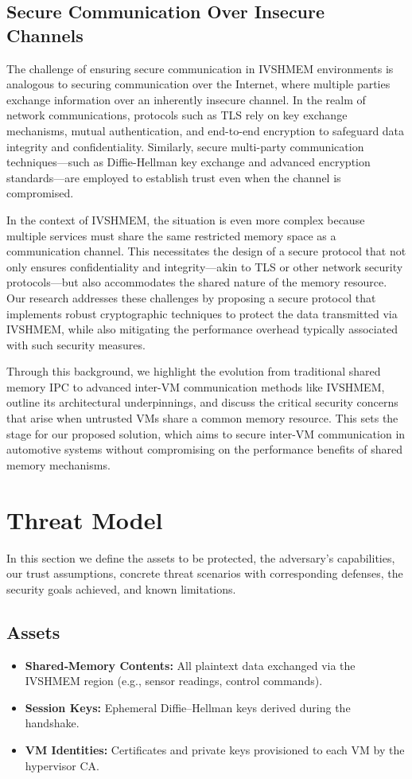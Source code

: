 \documentclass[conference]{IEEEtran}
\begin{document}
\subsection{Secure Communication Over Insecure Channels}

The challenge of ensuring secure communication in IVSHMEM environments is
analogous to securing communication over the Internet, where multiple parties
exchange information over an inherently insecure channel. In the realm of
network communications, protocols such as TLS rely on key exchange mechanisms,
mutual authentication, and end-to-end encryption to safeguard data integrity
and confidentiality. Similarly, secure multi-party communication
techniques—such as Diffie-Hellman key exchange and advanced encryption
standards—are employed to establish trust even when the channel is compromised.

In the context of IVSHMEM, the situation is even more complex because multiple
services must share the same restricted memory space as a communication
channel. This necessitates the design of a secure protocol that not only
ensures confidentiality and integrity—akin to TLS or other network security
protocols—but also accommodates the shared nature of the memory resource. Our
research addresses these challenges by proposing a secure protocol that
implements robust cryptographic techniques to protect the data transmitted via
IVSHMEM, while also mitigating the performance overhead typically associated
with such security measures.

Through this background, we highlight the evolution from traditional shared
memory IPC to advanced inter-VM communication methods like IVSHMEM, outline its
architectural underpinnings, and discuss the critical security concerns that
arise when untrusted VMs share a common memory resource. This sets the stage
for our proposed solution, which aims to secure inter-VM communication in
automotive systems without compromising on the performance benefits of shared
memory mechanisms.

\section{Threat Model}

In this section we define the assets to be protected, the adversary’s
capabilities, our trust assumptions, concrete threat scenarios with
corresponding defenses, the security goals achieved, and known limitations.

\subsection{Assets}
\begin{itemize}
  \item \textbf{Shared‐Memory Contents:} All plaintext data exchanged via the IVSHMEM region (e.g., sensor readings, control commands).
  \item \textbf{Session Keys:} Ephemeral Diffie–Hellman keys derived during the handshake.
  \item \textbf{VM Identities:} Certificates and private keys provisioned to each VM by the hypervisor CA.
\end{itemize}
\end{document}
